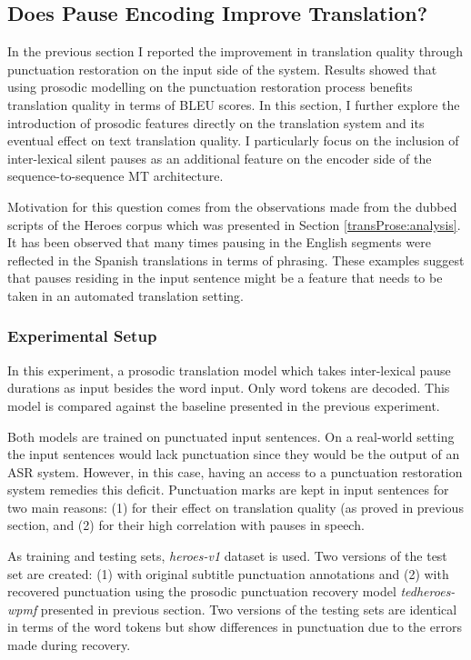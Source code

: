 \subsection{Does Pause Encoding Improve Translation?}
\label{transProse:Q2}
In the previous section I reported the improvement in translation quality through punctuation restoration on the input side of the system. Results showed that using prosodic modelling on the punctuation restoration process benefits translation quality in terms of BLEU scores. In this section, I further explore the introduction of prosodic features directly on the translation system and its eventual effect on text translation quality. I particularly focus on the inclusion of inter-lexical silent pauses as an additional feature on the encoder side of the sequence-to-sequence MT architecture. 

Motivation for this question comes from the observations made from the dubbed scripts of the Heroes corpus which was presented in Section \ref{transProse:analysis}. It has been observed that many times pausing in the English segments were reflected in the Spanish translations in terms of phrasing. These examples suggest that pauses residing in the input sentence might be a feature that needs to be taken in an automated translation setting. 

\subsubsection{Experimental Setup}

In this experiment, a prosodic translation model which takes inter-lexical pause durations as input besides the word input. Only word tokens are decoded. This model is compared against the baseline presented in the previous experiment. 

Both models are trained on punctuated input sentences. On a real-world setting the input sentences would lack punctuation since they would be the output of an ASR system. However, in this case, having an access to a punctuation restoration system remedies this deficit. Punctuation marks are kept in input sentences for two main reasons: (1) for their effect on translation quality (as proved in previous section, and (2) for their high correlation with pauses in speech. 

As training and testing sets, \textit{heroes-v1} dataset is used. Two versions of the test set are created: (1) with original subtitle punctuation annotations and (2) with recovered punctuation using the prosodic punctuation recovery model \textit{tedheroes-wpmf} presented in previous section. Two versions of the testing sets are identical in terms of the word tokens but show differences in punctuation due to the errors made during recovery.

